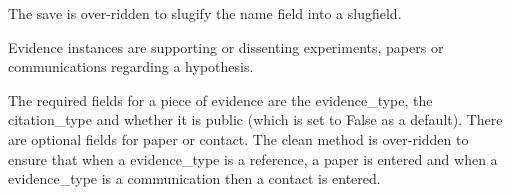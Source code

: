 \documentclass[letterpaper,10pt,english]{sphinxmanual}
\begin{document}
\begin{fulllineitems}

\begin{fulllineitems}
\label{api:experimentdb.hypotheses.models.Entity.save}
The save is over-ridden to slugify the name field into a slugfield.


\end{fulllineitems}


\end{fulllineitems}


\begin{fulllineitems}
\label{api:experimentdb.hypotheses.models.Evidence}
Evidence instances are supporting or dissenting experiments, papers or communications regarding a hypothesis.


The required fields for a piece of evidence are the evidence\_type, the citation\_type and whether it is public (which is set to False as a default).  There are optional fields for paper or contact.  The clean method is over-ridden to ensure that when a evidence\_type is a reference, a paper is entered and when a evidence\_type is a communication then a contact is entered.


\begin{fulllineitems}
\label{api:experimentdb.hypotheses.models.Evidence.DoesNotExist}
\end{fulllineitems}


\begin{fulllineitems}
\label{api:experimentdb.hypotheses.models.Evidence.MultipleObjectsReturned}
\end{fulllineitems}


\begin{fulllineitems}
\label{api:experimentdb.hypotheses.models.Evidence.citation_type}
\end{fulllineitems}


\end{fulllineitems}
\end{document}
